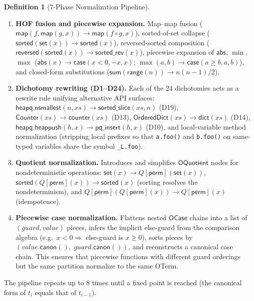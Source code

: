 \documentclass[11pt,a4paper]{report}
\theoremstyle{definition}
\newtheorem{definition}{Definition}[chapter]
\theoremstyle{plain}
\begin{document}
\begin{definition}[7-Phase Normalization Pipeline]
\begin{enumerate}[label=\textbf{P\arabic*}:]
  \item \textbf{HOF fusion and piecewise expansion.}  Map--map fusion
    ($\mathsf{map}(f, \mathsf{map}(g, x)) \to \mathsf{map}(f \circ g, x)$),
    sorted-of-set collapse
    ($\mathsf{sorted}(\mathsf{set}(x)) \to \mathsf{sorted}(x)$),
    reversed-sorted composition
    ($\mathsf{reversed}(\mathsf{sorted}(x)) \to \mathsf{sorted\_rev}(x)$),
    piecewise expansion of $\mathsf{abs}$, $\min$, $\max$
    ($\mathsf{abs}(x) \to \mathsf{case}(x{<}0, {-}x, x)$;
    $\max(a,b) \to \mathsf{case}(a {\geq} b, a, b)$),
    and closed-form substitutions
    ($\mathsf{sum}(\mathsf{range}(n)) \to n(n{-}1)/2$).

  \item \textbf{Dichotomy rewriting (D1--D24).}  Each of the 24
    dichotomies acts as a rewrite rule unifying alternative API surfaces:
    $\mathsf{heapq.nsmallest}(n, xs) \to \mathsf{sorted\_slice}(xs, n)$
    (D19),
    $\mathsf{Counter}(xs) \to \mathsf{counter}(xs)$ (D13),
    $\mathsf{OrderedDict}(xs) \to \mathsf{dict}(xs)$ (D14),
    $\mathsf{heapq.heappush}(h, x) \to \mathsf{pq\_insert}(h, x)$ (D10),
    and local-variable method normalization (stripping local prefixes
    so that \texttt{a.foo()} and \texttt{b.foo()} on same-typed
    variables share the symbol \texttt{\_L.foo}).

  \item \textbf{Quotient normalization.}  Introduces and simplifies
    $\mathsf{OQuotient}$ nodes for nondeterministic operations:
    $\mathsf{set}(x) \to Q[\mathsf{perm}](\mathsf{set}(x))$,
    $\mathsf{sorted}(Q[\mathsf{perm}](x)) \to \mathsf{sorted}(x)$
    (sorting resolves the nondeterminism),
    and $Q[\mathsf{perm}](Q[\mathsf{perm}](x)) \to Q[\mathsf{perm}](x)$
    (idempotence).

  \item \textbf{Piecewise case normalization.}  Flattens nested
    $\mathsf{OCase}$ chains into a list of $(\mathit{guard},
    \mathit{value})$ pieces, infers the implicit else-guard from the
    comparison algebra (e.g.\ $x < 0 \Rightarrow$ else-guard is
    $x \geq 0$), sorts pieces by
    $(\mathit{value}.\mathsf{canon}(),\; \mathit{guard}.\mathsf{canon}())$,
    and reconstructs a canonical case chain.  This ensures that
    piecewise functions with different guard orderings but the same
    partition normalize to the same OTerm.
\end{enumerate}
The pipeline repeats up to 8 times until a fixed point is reached
(the canonical form of $t_i$ equals that of $t_{i-1}$).
\end{definition}
\end{document}
